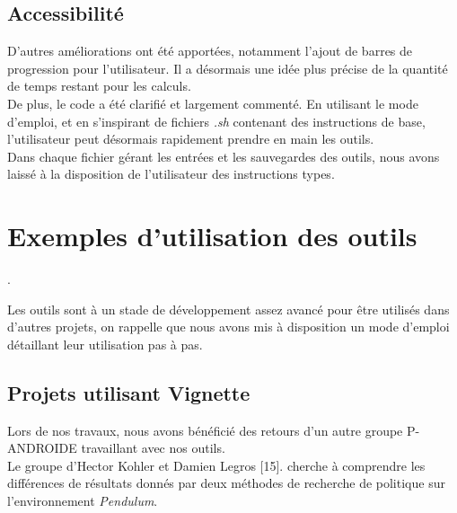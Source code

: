 \documentclass[12pt]{article}
\begin{document}

\newpage
\subsection{Accessibilité}

D’autres améliorations ont été apportées, notamment l’ajout de barres de progression pour l’utilisateur. Il a désormais une idée plus précise de la quantité de temps restant pour les calculs. \\

De plus, le code a été clarifié et largement commenté. En utilisant le mode d'emploi, et en s'inspirant de fichiers \emph{.sh} contenant des instructions de base, l'utilisateur peut désormais rapidement prendre en main les outils. \\

Dans chaque fichier gérant les entrées et les sauvegardes des outils, nous avons laissé à la disposition de l'utilisateur des instructions types. \\

\section{Exemples d'utilisation des outils} \label{Exemples}.

Les outils sont à un stade de développement assez avancé pour être utilisés dans d'autres projets, on rappelle que nous avons mis à disposition un mode d'emploi détaillant leur utilisation pas à pas. \\

\subsection{Projets utilisant Vignette}

Lors de nos travaux, nous avons bénéficié des retours d'un autre groupe P-ANDROIDE travaillant avec nos outils. \\

Le groupe d'Hector Kohler et Damien Legros [15]. cherche à comprendre les différences de résultats donnés par deux méthodes de recherche de politique sur l'environnement \emph{Pendulum}. \\
\end{document}
